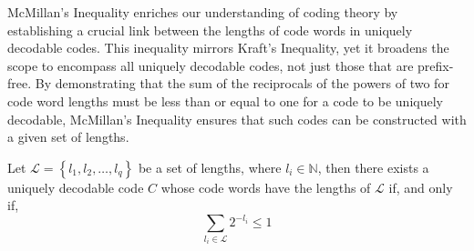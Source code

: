 McMillan's Inequality enriches our understanding of coding theory by establishing a crucial link between the lengths of code words in uniquely decodable codes. This inequality mirrors Kraft's Inequality, yet it broadens the scope to encompass all uniquely decodable codes, not just those that are prefix-free. By demonstrating that the sum of the reciprocals of the powers of two for code word lengths must be less than or equal to one for a code to be uniquely decodable, McMillan's Inequality ensures that such codes can be constructed with a given set of lengths.

\begin{theorem}
\label{th:McMillan-Inequality}
Let $\mathcal{L}=\left\{ l_{1},l_{2},\ldots,l_{q}\right\}$ be a set of lengths, where $l_{i}\in\mathbb{N}$, then there exists a uniquely decodable code $C$ whose code words have the lengths of $\mathcal{L}$ if, and only if,
\[
\sum_{l_{i}\in\mathcal{L}}2^{-l_{i}} \leq 1
\]
\end{theorem}

